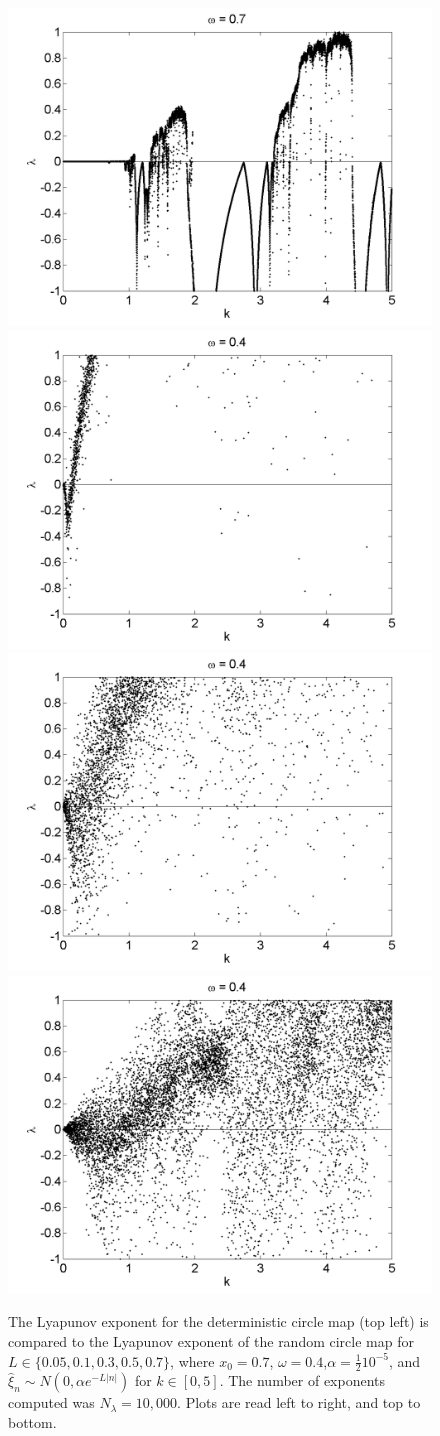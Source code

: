 \begin{figure}[!h]
\caption[Lyapunov exponent in the random circle map (normal distribution) compared to the
deterministic map, varying $k$, $\alpha = \frac{1}{2}10^{-5}$]{The Lyapunov exponent for the deterministic
  circle map (top left) is compared
  to the Lyapunov exponent of the random circle map for $L \in
  \{0.05,0.1,0.3,0.5,0.7\}$, where $x_0=0.7$, $\omega=0.4$,$\alpha =\frac{1}{2}10^{-5}$, and $\hat{\xi}_n\sim
  N(0,\alpha e^{-L|n|})$ for $k \in [0,5]$. The number of exponents computed was $N_\lambda=10,000$. Plots are read left to right, and top to bottom. }\label{fig:rcirclyap2_n}
\centering
\includegraphics[width=.5\textwidth]{figs/det_circ_lyap_k.png}\hfill
\includegraphics[width=.5\textwidth]{figs/rcirc_n_lyap_halfa10000_L_005_w_04_k.png}\\
\includegraphics[width=.5\textwidth]{figs/rcirc_n_lyap_halfa10000_L_01_w_04_k.png}\hfill
\includegraphics[width=.5\textwidth]{figs/rcirc_n_lyap_halfa10000_L_03_w_04_k.png}\\

\end{figure}
